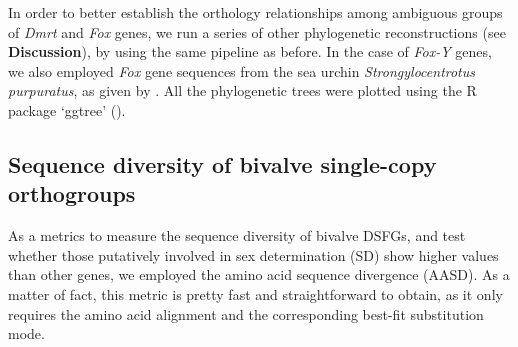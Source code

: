\documentclass[../main.tex]{subfiles}
\begin{document}
In order to better establish the orthology relationships among ambiguous groups of \textit{Dmrt} and \textit{Fox} genes, we run a series of other phylogenetic reconstructions (see \textbf{Discussion}), by using the same pipeline as before. In the case of \textit{Fox-Y} genes, we also employed \textit{Fox} gene sequences from the sea urchin \textit{Strongylocentrotus purpuratus}, as given by \textbf{\cite{tu2006sea}}. All the phylogenetic trees were plotted using the R package ‘ggtree’ (\textbf{\cite{yu2017ggtree}}).

\subsection{Sequence diversity of bivalve single-copy orthogroups}
As a metrics to measure the sequence diversity of bivalve DSFGs, and test whether those putatively involved in sex determination (SD) show higher values than other genes, we employed the amino acid sequence divergence (AASD). As a matter of fact, this metric is pretty fast and straightforward to obtain, as it only requires the amino acid alignment and the corresponding best-fit substitution mode.
\end{document}

